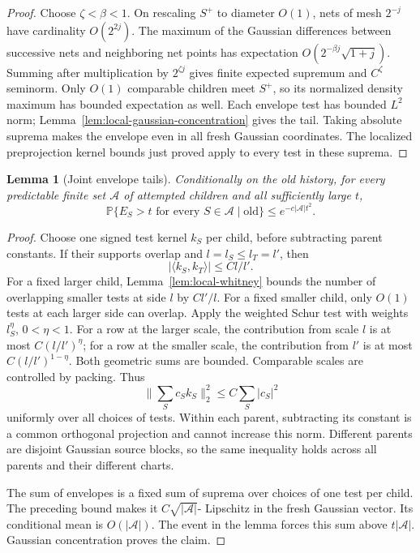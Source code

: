 \documentclass[11pt]{article}
\newtheorem{lemma}[theorem]{Lemma}
\newcommand{\PP}{\mathbb P}
\numberwithin{equation}{section}
\begin{document}
\begin{proof}
Choose $\zeta<\beta<1$. On rescaling $S^+$ to diameter $O(1)$, nets of
mesh $2^{-j}$ have cardinality $O(2^{2j})$. The maximum of the Gaussian
differences between successive nets and neighboring net points has
expectation $O(2^{-\beta j}\sqrt{1+j})$. Summing after multiplication
by $2^{\zeta j}$ gives finite expected supremum and $C^\zeta$ seminorm.
Only $O(1)$ comparable children meet $S^+$, so its normalized density
maximum has bounded expectation as well. Each envelope test has bounded
$L^2$ norm; Lemma~\ref{lem:local-gaussian-concentration} gives the tail.
Taking absolute suprema makes the envelope even in all fresh Gaussian
coordinates. The localized preprojection kernel bounds just proved apply
to every test in these suprema.
\end{proof}

\begin{lemma}[Joint envelope tails]\label{lem:local-joint-tail}
Conditionally on the old history, for every predictable finite set
$\mathcal A$ of attempted children and all sufficiently large $t$,
\[
 \PP\{E_S>t\text{ for every }S\in\mathcal A\mid\mathrm{old}\}
 \le e^{-c|\mathcal A|t^2}.
\]
\end{lemma}
\begin{proof}
Choose one signed test kernel $k_S$ per child, before subtracting parent
constants. If their supports overlap and $l=l_S\le l_T=l'$, then
\[
 |\langle k_S,k_T\rangle|\le C l/l'.
\]
For a fixed larger child, Lemma~\ref{lem:local-whitney} bounds the number
of overlapping smaller tests at side $l$ by $Cl'/l$. For a fixed
smaller child, only $O(1)$ tests at each larger side can overlap. Apply
the weighted Schur test with weights $l_S^\eta$, $0<\eta<1$. For a row
at the larger scale, the contribution from scale $l$ is at most
$C(l/l')^\eta$; for a row at the smaller scale, the contribution from
$l'$ is at most $C(l/l')^{1-\eta}$. Both geometric sums are bounded.
Comparable scales are controlled by packing. Thus
\[
 \Big\|\sum_Sc_Sk_S\Big\|_2^2\le C\sum_S|c_S|^2
\]
uniformly over all choices of tests. Within each parent, subtracting
its constant is a common orthogonal projection and cannot increase this
norm. Different parents are disjoint Gaussian source blocks, so the
same inequality holds across all parents and their different charts.

The sum of envelopes is a fixed sum of suprema over choices of one
test per child. The preceding bound makes it $C\sqrt{|\mathcal A|}$-
Lipschitz in the fresh Gaussian vector. Its conditional mean is
$O(|\mathcal A|)$. The event in the lemma forces this sum above
$t|\mathcal A|$. Gaussian concentration proves the claim.
\end{proof}
\end{document}
